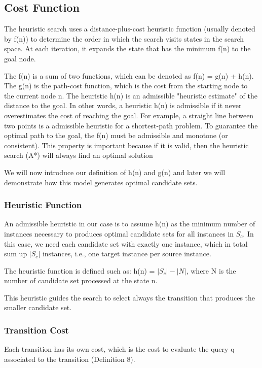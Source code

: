 \subsection{Cost Function} 
 
The heuristic search uses a distance-plus-cost heuristic function (usually denoted by f(n)) to determine the order in which the search visits states in the search space. At each iteration, it expands the state that has the minimum f(n) to the goal node. 

The f(n) is a sum of two functions, which can be denoted as f(n) = g(n) + h(n). The g(n) is the path-cost function, which is the cost from the starting node to the current node n. The heuristic h(n) is an admissible "heuristic estimate" of the distance to the goal. In other words, a heuristic h(n) is admissible if it never overestimates the cost of reaching the goal. For example, a straight line between two points is a admissible heuristic for a shortest-path problem. To guarantee the optimal path to the goal, the f(n) must be admissible and monotone (or consistent). This property is important because if it is valid, then the heuristic search (A*) will always find an optimal solution

We will now introduce our definition of h(n) and g(n) and later we will demonstrate how this model generates optimal candidate sets. 

\subsubsection{Heuristic Function} 
An admissible heuristic in our case is to assume h(n) as the minimum number of instances necessary to produces optimal candidate sets for all instances in $S_c$. In this case, we need each candidate set with exactly one instance, which in total sum up $|S_c|$ instances, i.e., one target instance per source instance.

\begin{definition} The heuristic function is defined such as: h(n) = $|S_c| - |N|$, where N is the number of candidate set processed at the state n.
\end{definition}   

This heuristic guides the search to select always the transition that produces the smaller candidate set. 

\subsubsection{Transition Cost} Each transition has its own cost, which is the cost to evaluate the query q associated to the transition (Definition 8).

